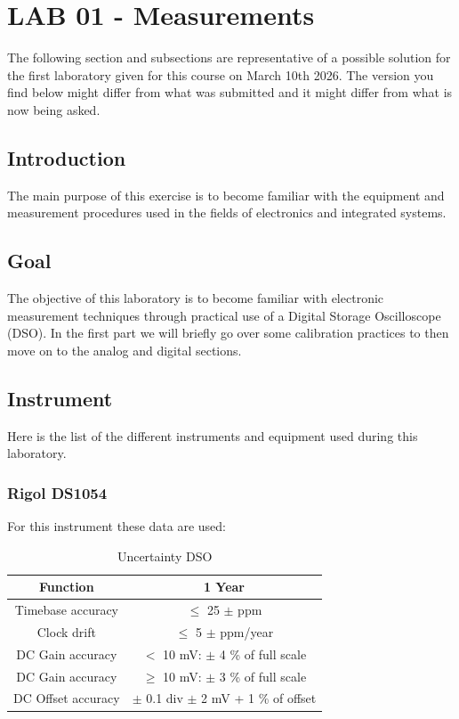 \documentclass[../main.tex]{subfiles}
\begin{document}
\clearpage
\thispagestyle{empty}
\vspace*{7cm}
\section{LAB 01 - Measurements}
\vspace*{1.5cm}

The following section and subsections are representative of a possible solution for the first laboratory given for this course on March 10th 2026.
The version you find below might differ from what was submitted and it might differ from what is now being asked.


\vspace*{1cm}
\subsection{Introduction}


The main purpose of this exercise is to become familiar with the equipment and measurement procedures used in the fields of electronics and integrated systems.

\subsection*{Goal}

The objective of this laboratory is to become familiar with electronic measurement techniques through practical use of a Digital Storage Oscilloscope (DSO).
In the first part we will briefly go over some calibration practices to then move on to the analog and digital sections.

\subsection*{Instrument}

Here is the list of the different instruments and equipment used during this laboratory.

\subsubsection*{Rigol DS1054}

For this instrument these data are used:

\begin{table}[h!]
\centering	

\begin{tabular}{c  c}
\textbf{Function} & \textbf{1 Year} \\
\hline
Timebase accuracy &  $\leq$ 25 $\pm$ ppm \\
\hline
Clock drift & $\leq$ 5 $\pm$ ppm/year \\
\hline
DC Gain accuracy & $<$ 10 mV: $\pm$ 4 \% of full scale  \\
\hline
DC Gain accuracy & $\geq$ 10 mV: $\pm$ 3 \% of full scale  \\
\hline
DC Offset accuracy & $\pm$ 0.1 div $\pm$ 2 mV + 1 \% of offset  \\
\end{tabular}
 
\caption{Uncertainty DSO}
\label{dosunc}
\end{table}
\end{document}
